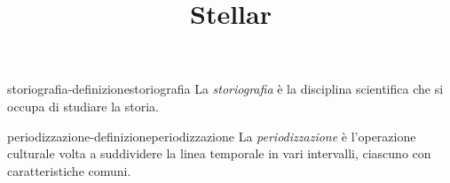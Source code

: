 \documentclass[preview]{standalone}
\begin{document}
\title{Stellar}
\genpage

\begin{snippetdefinition}{storiografia-definizione}{storiografia}
    La \textit{storiografia} è la disciplina scientifica che si occupa di studiare la storia.
\end{snippetdefinition}

\begin{snippetdefinition}{periodizzazione-definizione}{periodizzazione}
    La \textit{periodizzazione} è l'operazione culturale volta a suddividere la linea temporale in vari intervalli,
    ciascuno con caratteristiche comuni.
\end{snippetdefinition}

\end{document}
